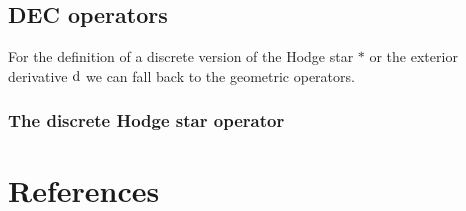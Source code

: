   \subsection{DEC operators}
    For the definition of a discrete version of the Hodge star \( * \) or the exterior derivative \( \mathrm{d} \) we can fall back to the
    geometric operators.

    \subsubsection{The discrete Hodge star operator}
      
      
    

\section*{References}




